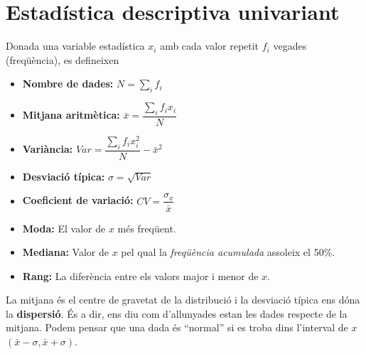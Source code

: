 
\section{Estadística descriptiva univariant}
\begin{theorybox}
	Donada una variable estadística $x_i$ amb cada valor repetit $f_i$ vegades (freqüència), es defineixen	
	
	\begin{minipage}{0.45\textwidth}
		\begin{itemize}
			\item \textbf{Nombre de dades:} $N=\sum_i f_i$
			\item \textbf{Mitjana aritmètica:} $\bar x=\dfrac{\sum_i f_i x_i}{N}$
			\item \textbf{Variància:} $Var=\dfrac{\sum_i f_i x^2_i}{N}-\bar x^2$
			\item \textbf{Desviació típica:} $\sigma=\sqrt{Var}$		
			\item \textbf{Coeficient de variació:} $CV = \dfrac{\sigma_x}{\bar x}$
		\end{itemize}
	\end{minipage}
	\hspace{0.3cm}
	\begin{minipage}{0.44\textwidth}
		\begin{itemize}
			\item \textbf{Moda:} El valor de $x$ més freqüent.
			\item \textbf{Mediana:} Valor de $x$ pel qual la {\normalfont \textit{freqüència acumulada}} assoleix el 50\%.
			\item \textbf{Rang:} La diferència entre els valors major i menor de $x$.
			
		\end{itemize}
	\end{minipage}
	
	La mitjana és el centre de gravetat de la distribució i la desviació típica ens dóna la \textbf{dispersió}. És a dir, ens diu com d'allunyades estan les dades respecte de la mitjana. 
	Podem pensar que una dada és ``normal'' si es troba dins l'interval de $x$ $(\bar x -\sigma, \bar x + \sigma)$.
\end{theorybox}



